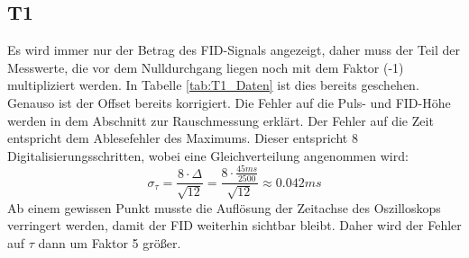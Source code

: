 \documentclass[12pt,a4paper]{article}
\begin{document}
\subsection{T1}
Es wird immer nur der Betrag des FID-Signals angezeigt, daher muss der Teil der Messwerte, die vor dem Nulldurchgang liegen noch mit dem Faktor (-1) multipliziert werden. In Tabelle \ref{tab:T1_Daten} ist dies bereits geschehen. Genauso ist der Offset bereits korrigiert. Die Fehler auf die Puls- und FID-Höhe werden in dem Abschnitt zur Rauschmessung erklärt. Der Fehler auf die Zeit entspricht dem Ablesefehler des Maximums. Dieser entspricht 8 Digitalisierungsschritten, wobei eine Gleichverteilung angenommen wird:
\begin{equation*}
\sigma _{\tau} = \dfrac{8 \cdot \Delta}{\sqrt{12}} = \dfrac{8 \cdot \frac{45 ms}{2500}}{\sqrt{12}} \approx 0.042 ms
\end{equation*}
Ab einem gewissen Punkt musste die Auflösung der Zeitachse des Oszilloskops verringert werden, damit der FID weiterhin sichtbar bleibt. Daher wird der Fehler auf $\tau$ dann um Faktor 5 größer.
\end{document}

